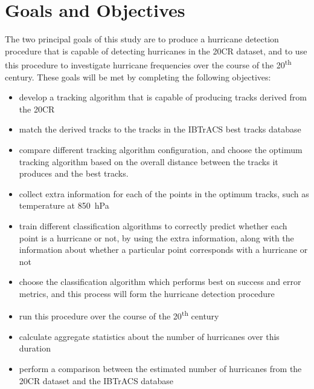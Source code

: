 \documentclass[pdftex,12pt,a4paper]{report}
\newcommand{\ts}{\textsuperscript}
\begin{document}
\section{Goals and Objectives}

The two principal goals of this study are to produce a hurricane detection procedure that is capable
of detecting hurricanes in the 20CR dataset, and to use this procedure to investigate hurricane
frequencies over the course of the 20\ts{th} century. These goals will be met by completing the
following objectives:

\begin{itemize}
    \item develop a tracking algorithm that is capable of producing tracks derived from the 20CR
    \item match the derived tracks to the tracks in the IBTrACS best tracks database
    \item compare different tracking algorithm configuration, and choose the optimum tracking
        algorithm based on the overall distance between the tracks it produces and the best tracks.
    \item collect extra information for each of the points in the optimum tracks, such as
        temperature at \SI{850}{hPa}
    \item train different classification algorithms to correctly predict whether each point is a
        hurricane or not, by using the extra information, along with the information about whether a
        particular point corresponds with a hurricane or not
    \item choose the classification algorithm which performs best on success and error metrics, and
        this process will form the hurricane detection procedure
    \item run this procedure over the course of the 20\ts{th} century
    \item calculate aggregate statistics about the number of hurricanes over this duration
    \item perform a comparison between the estimated number of hurricanes from the 20CR dataset and
        the IBTrACS database
\end{itemize}
\end{document}
